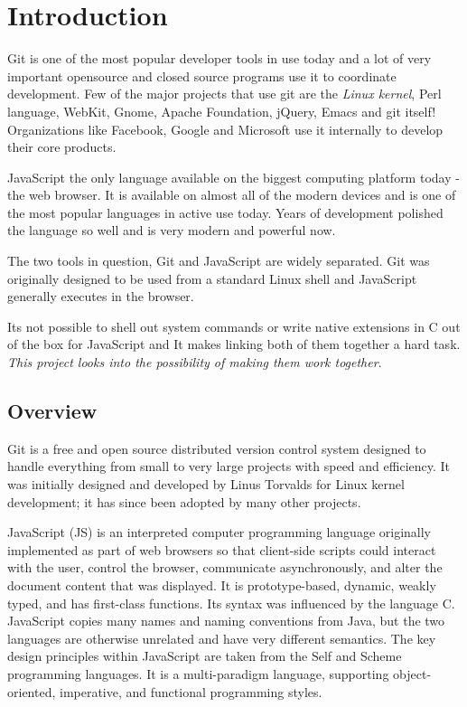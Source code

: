 \chapter{Introduction}

Git\cite{git} is one of the most popular developer tools in use today and a lot
of very important opensource and closed source programs use it to coordinate
development. Few of the major projects that use git are the \textit{Linux
  kernel}, Perl language, WebKit, Gnome, Apache Foundation, jQuery, Emacs and
git itself! Organizations like Facebook, Google and Microsoft use it internally
to develop their core products.

JavaScript\cite{javascript} the only language available on the biggest computing
platform today - the web browser. It is available on almost all of the modern
devices and is one of the most popular languages in active use today. Years of
development polished the language so well and is very modern and powerful now.

The two tools in question, Git and JavaScript are widely separated. Git was
originally designed to be used from a standard Linux shell and JavaScript
generally executes in the browser.

Its not possible to shell out system commands or write native extensions in C
out of the box for JavaScript and It makes linking both of them together a hard
task. \textit{This project looks into the possibility of making them work
  together}.

\section{Overview}

Git is a free and open source distributed version control system designed to
handle everything from small to very large projects with speed and efficiency.
It was initially designed and developed by Linus Torvalds for Linux kernel
development; it has since been adopted by many other projects.

JavaScript (JS) is an interpreted computer programming language originally
implemented as part of web browsers so that client-side scripts could interact
with the user, control the browser, communicate asynchronously, and alter the
document content that was displayed. It is prototype-based, dynamic, weakly
typed, and has first-class functions. Its syntax was influenced by the language
C. JavaScript copies many names and naming conventions from Java, but the two
languages are otherwise unrelated and have very different semantics. The key
design principles within JavaScript are taken from the Self and Scheme
programming languages. It is a multi-paradigm language, supporting
object-oriented, imperative, and functional programming styles.

